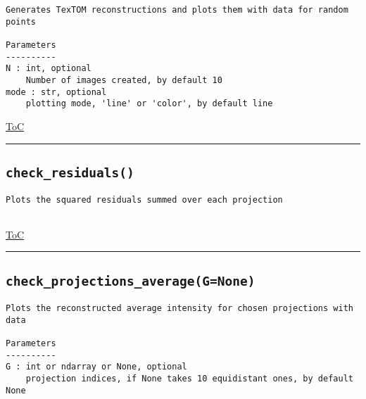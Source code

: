 \documentclass{article}
\begin{document}
\begin{lstlisting}[language=docstring]
Generates TexTOM reconstructions and plots them with data for random points

Parameters
----------
N : int, optional
    Number of images created, by default 10    
mode : str, optional
    plotting mode, 'line' or 'color', by default line
\end{lstlisting}

\begin{flushright}

\hyperref[toc]{ToC}

\end{flushright}



\vspace{5mm}

\hrule

\subsection*{\texttt{check\_residuals()}}

\begin{lstlisting}[language=docstring]
Plots the squared residuals summed over each projection
    
\end{lstlisting}

\begin{flushright}

\hyperref[toc]{ToC}

\end{flushright}



\vspace{5mm}

\hrule

\subsection*{\texttt{check\_projections\_average(G=None)}}

\begin{lstlisting}[language=docstring]
Plots the reconstructed average intensity for chosen projections with data

Parameters
----------
G : int or ndarray or None, optional
    projection indices, if None takes 10 equidistant ones, by default None
\end{lstlisting}
\end{document}
